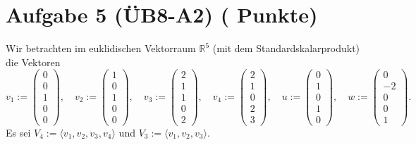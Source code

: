 \documentclass[11pt, a4paper]{article}
\newcommand{\aufgabe}[2]{%
  \section*{\Large\bfseries Aufgabe #1%
  \if\relax\detokenize{#2}\relax\else \hfill\normalfont\normalsize(#2 Punkte)\fi}%
  \vspace{-1.5ex}
}
\begin{document}
\aufgabe{5 (ÜB8-A2)}{}
Wir betrachten im euklidischen Vektorraum $\mathbb{R}^5$ (mit dem Standardskalarprodukt) die Vektoren
\[
v_1:=\begin{pmatrix}0\\0\\1\\0\\0\end{pmatrix},\quad
v_2:=\begin{pmatrix}1\\0\\1\\0\\0\end{pmatrix},\quad
v_3:=\begin{pmatrix}2\\1\\1\\0\\2\end{pmatrix},\quad
v_4:=\begin{pmatrix}2\\1\\0\\2\\3\end{pmatrix},\quad
u:=\begin{pmatrix}0\\1\\0\\1\\0\end{pmatrix},\quad
w:=\begin{pmatrix}0\\-2\\0\\0\\1\end{pmatrix}.
\]
Es sei $V_4:=\langle v_1,v_2,v_3,v_4\rangle$ und $V_3:=\langle v_1,v_2,v_3\rangle$.
\end{document}
